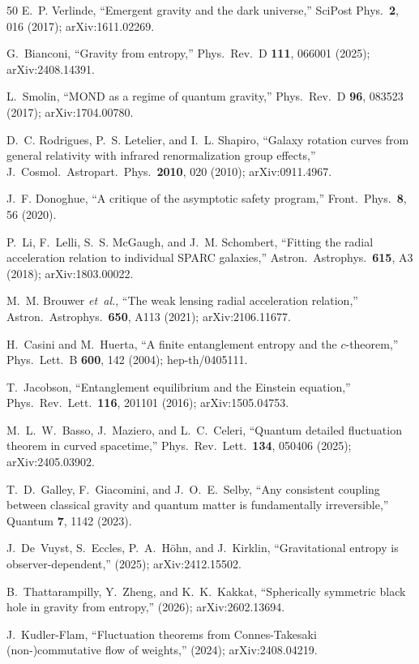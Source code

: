 \documentclass[prl,twocolumn,superscriptaddress,longbibliography,floatfix]{revtex4-2}
\begin{document}
\begin{thebibliography}{50}
E.~P. Verlinde,
``Emergent gravity and the dark universe,''
SciPost Phys.\ \textbf{2}, 016 (2017); arXiv:1611.02269.

G.~Bianconi,
``Gravity from entropy,''
Phys.\ Rev.\ D \textbf{111}, 066001 (2025);
arXiv:2408.14391.

L.~Smolin,
``MOND as a regime of quantum gravity,''
Phys.\ Rev.\ D \textbf{96}, 083523 (2017);
arXiv:1704.00780.

D.~C. Rodrigues, P.~S. Letelier, and I.~L. Shapiro,
``Galaxy rotation curves from general relativity with infrared
renormalization group effects,''
J.\ Cosmol.\ Astropart.\ Phys.\ \textbf{2010}, 020 (2010);
arXiv:0911.4967.

J.~F. Donoghue,
``A critique of the asymptotic safety program,''
Front.\ Phys.\ \textbf{8}, 56 (2020).

P.~Li, F.~Lelli, S.~S. McGaugh, and J.~M. Schombert,
``Fitting the radial acceleration relation to individual SPARC
galaxies,''
Astron.\ Astrophys.\ \textbf{615}, A3 (2018);
arXiv:1803.00022.

M.~M. Brouwer \emph{et~al.},
``The weak lensing radial acceleration relation,''
Astron.\ Astrophys.\ \textbf{650}, A113 (2021);
arXiv:2106.11677.

H.~Casini and M.~Huerta,
``A finite entanglement entropy and the $c$-theorem,''
Phys.\ Lett.\ B \textbf{600}, 142 (2004);
hep-th/0405111.

T.~Jacobson,
``Entanglement equilibrium and the Einstein equation,''
Phys.\ Rev.\ Lett.\ \textbf{116}, 201101 (2016);
arXiv:1505.04753.

M.~L.~W.~Basso, J.~Maziero, and L.~C.~Celeri,
``Quantum detailed fluctuation theorem in curved spacetime,''
Phys.\ Rev.\ Lett.\ \textbf{134}, 050406 (2025);
arXiv:2405.03902.

T.~D.~Galley, F.~Giacomini, and J.~O.~E.~Selby,
``Any consistent coupling between classical gravity and quantum matter is fundamentally irreversible,''
Quantum \textbf{7}, 1142 (2023).

J.~De~Vuyst, S.~Eccles, P.~A.~H\"{o}hn, and J.~Kirklin,
``Gravitational entropy is observer-dependent,''
(2025); arXiv:2412.15502.

B.~Thattarampilly, Y.~Zheng, and K.~K.~Kakkat,
``Spherically symmetric black hole in gravity from entropy,''
(2026); arXiv:2602.13694.

J.~Kudler-Flam,
``Fluctuation theorems from Connes-Takesaki (non-)commutative flow of weights,''
(2024); arXiv:2408.04219.

\end{thebibliography}
\end{document}
